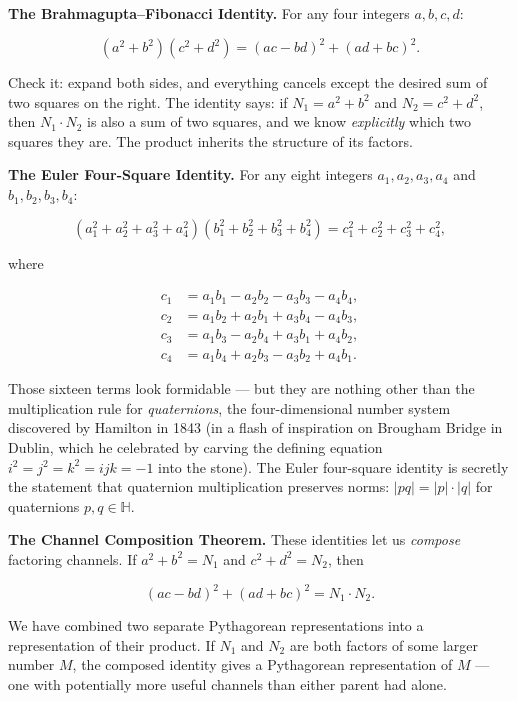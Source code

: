 \textbf{The Brahmagupta--Fibonacci Identity.} For any four integers \(a, b, c, d\):

\[(a^2 + b^2)(c^2 + d^2) = (ac - bd)^2 + (ad + bc)^2.\]

Check it: expand both sides, and everything cancels except the desired sum of two squares on the right. The identity says: if \(N_1 = a^2 + b^2\) and \(N_2 = c^2 + d^2\), then \(N_1 \cdot N_2\) is also a sum of two squares, and we know \emph{explicitly} which two squares they are. The product inherits the structure of its factors.

\textbf{The Euler Four-Square Identity.} For any eight integers \(a_1, a_2, a_3, a_4\) and \(b_1, b_2, b_3, b_4\):

\[(a_1^2 + a_2^2 + a_3^2 + a_4^2)(b_1^2 + b_2^2 + b_3^2 + b_4^2) = c_1^2 + c_2^2 + c_3^2 + c_4^2,\]

where

\[\begin{aligned}
c_1 &= a_1 b_1 - a_2 b_2 - a_3 b_3 - a_4 b_4, \\
c_2 &= a_1 b_2 + a_2 b_1 + a_3 b_4 - a_4 b_3, \\
c_3 &= a_1 b_3 - a_2 b_4 + a_3 b_1 + a_4 b_2, \\
c_4 &= a_1 b_4 + a_2 b_3 - a_3 b_2 + a_4 b_1.
\end{aligned}\]

Those sixteen terms look formidable --- but they are nothing other than the multiplication rule for \emph{quaternions}, the four-dimensional number system discovered by Hamilton in 1843 (in a flash of inspiration on Brougham Bridge in Dublin, which he celebrated by carving the defining equation \(i^2 = j^2 = k^2 = ijk = -1\) into the stone). The Euler four-square identity is secretly the statement that quaternion multiplication preserves norms: \(|pq| = |p| \cdot |q|\) for quaternions \(p, q \in \mathbb{H}\).

\textbf{The Channel Composition Theorem.} These identities let us \emph{compose} factoring channels. If \(a^2 + b^2 = N_1\) and \(c^2 + d^2 = N_2\), then

\[(ac - bd)^2 + (ad + bc)^2 = N_1 \cdot N_2.\]

We have combined two separate Pythagorean representations into a representation of their product. If \(N_1\) and \(N_2\) are both factors of some larger number \(M\), the composed identity gives a Pythagorean representation of \(M\) --- one with potentially more useful channels than either parent had alone.


